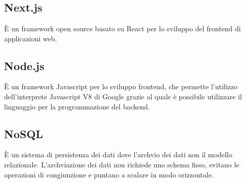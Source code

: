 \section{}
\subsection*{Next.js} È un framework open source basato su React per lo sviluppo del frontend di applicazioni web.
\subsection*{Node.js} È un framework Javascript per lo sviluppo frontend, che permette l'utilizzo dell'interprete Javascript V8 di Google grazie al quale è possibile utilizzare il linguaggio per la programmazione del backend.
\subsection*{NoSQL} È un sistema di persistenza dei dati dove l'archvio dei dati non il modello relazionale. L'archviazione dei dati non richiede uno schema fisso, evitano le operazioni di congiunzione e puntano a scalare in modo orizzontale.